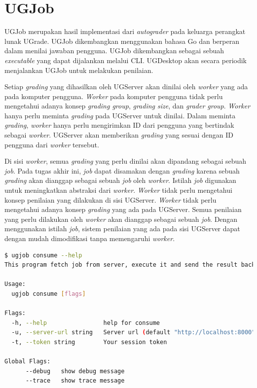 \section{UGJob}


\par UGJob merupakan hasil implementasi dari \textit{autograder} pada keluarga perangkat lunak UGrade. UGJob dikembangkan menggunakan bahasa Go dan berperan dalam menilai jawaban pengguna. UGJob dikembangkan sebagai sebuah \textit{executable} yang dapat dijalankan melalui CLI. UGDesktop akan secara periodik menjalankan UGJob untuk melakukan penilaian.

\par Setiap \textit{grading} yang dihasilkan oleh UGServer akan dinilai oleh \textit{worker} yang ada pada komputer pengguna. \textit{Worker} pada komputer pengguna tidak perlu mengetahui adanya konsep \textit{grading group}, \textit{grading size}, dan \textit{grader group}. \textit{Worker} hanya perlu meminta \textit{grading} pada UGServer untuk dinilai. Dalam meminta \textit{grading}, \textit{worker} hanya perlu mengirimkan ID dari pengguna yang bertindak sebagai \textit{worker}. UGServer akan memberikan \textit{grading} yang sesuai dengan ID pengguna dari \textit{worker} tersebut.

\par Di sisi \textit{worker}, semua \textit{grading} yang perlu dinilai akan dipandang sebagai sebuah \textit{job}. Pada tugas akhir ini, \textit{job} dapat disamakan dengan \textit{grading} karena sebuah \textit{grading} akan dianggap sebagai sebuah \textit{job} oleh \textit{worker}. Istilah \textit{job} digunakan untuk meningkatkan abstraksi dari \textit{worker}. \textit{Worker} tidak perlu mengetahui konsep penilaian yang dilakukan di sisi UGServer. \textit{Worker} tidak perlu mengetahui adanya konsep \textit{grading} yang ada pada UGServer. Semua penilaian yang perlu dilakukan oleh \textit{worker} akan dianggap sebagai sebuah \textit{job}. Dengan menggunakan istilah \textit{job}, sistem penilaian yang ada pada sisi UGServer dapat dengan mudah dimodifikasi tanpa memengaruhi \textit{worker}.

\begin{lstlisting}[caption={Contoh Hasil Eksekusi Perintah \textit{ugjob consume}},label={lst:ugjob-consume},language=Bash,style=BashStyle]
$ ugjob consume --help
This program fetch job from server, execute it and send the result back to server.

Usage:
  ugjob consume [flags]

Flags:
  -h, --help                help for consume
  -u, --server-url string   Server url (default "http://localhost:8000")
  -t, --token string        Your session token

Global Flags:
      --debug   show debug message
      --trace   show trace message
\end{lstlisting}

